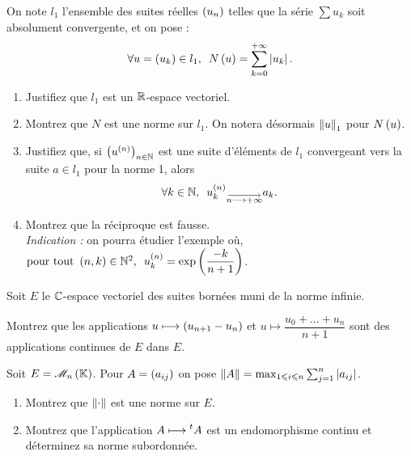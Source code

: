 \begin{corr}
\end{corr}

\begin{exopss}[Exercice 8]
On note \(l_1\) l'ensemble des suites réelles \(\left(u_n\right)\) telles que la série \(\sum u_k\) soit absolument convergente, et on pose : \[\quantifs{\forall u=\paren{u_k}\in l_1}N\paren{u}=\sum_{k=0}^{\pinf}\abs{u_k}.\]

\begin{enumerate}
    \item Justifiez que \(l_1\) est un \(\mathbb{R}\)-espace vectoriel. \\
    \item Montrez que \(N\) est une norme sur \(l_1\). On notera désormais \(\left\|u\right\|_1\) pour \(N\left(u\right)\). \\
    \item Justifiez que, si \(\left(u^{\left(n\right)}\right)_{n\in\mathbb{N}}\) est une suite d'éléments de \(l_1\) convergeant vers la suite \(a\in l_1\) pour la norme 1, alors \[\quantifs{\forall k\in\N}u_k\deriv{n}\tendqd{n\to\pinf}a_k.\]
    \item Montrez que la réciproque est fausse. \\ \textit{Indication :} on pourra étudier l'exemple où, \(\quantifs{\text{pour tout }\paren{n,k}\in\N^2}u_k\deriv{n}=\exp\paren{\dfrac{-k}{n+1}}\).
\end{enumerate}
\end{exopss}

\begin{corr}
\end{corr}

\begin{exops}[Exercice 9]
Soit \(E\) le \(\mathbb{C}\)-espace vectoriel des suites bornées muni de la norme infinie.

Montrez que les applications \(u\longmapsto\left(u_{n+1}-u_n\right)\) et \(u\mapsto\dfrac{u_0+\dots+u_n}{n+1}\) sont des applications continues de \(E\) dans \(E\).
\end{exops}

\begin{corr}
\end{corr}

\begin{exopss}[Exercice 10]
Soit \(E=\M{n}\). Pour \(A=\left(a_{ij}\right)\) on pose \(\left\|A\right\|=\max_{1\leqslant i\leqslant n}\sum_{j=1}^n\left\lvert a_{ij}\right\rvert\).

\begin{enumerate}
    \item Montrez que \(\left\|\cdot\right\|\) est une norme sur \(E\). \\
    \item Montrez que l'application \(A\longmapsto\prescript{t}{}{A}\) est un endomorphisme continu et déterminez sa norme subordonnée.
\end{enumerate}
\end{exopss}

